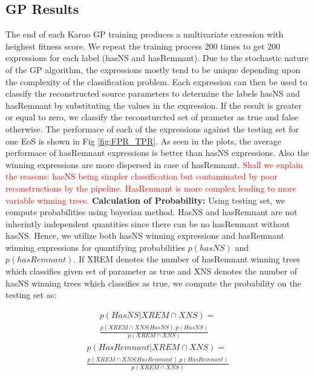 \subsection{GP Results}

The end of each Karoo GP training produces a multivariate exression with heighest fitness score. We repeat the training process 200 times to get 200 expressions for each label (hasNS and hasRemnant). Due to the stochastic nature of the GP algorithm, the expressions mostly tend to be unique depending upon the complexity of the classification problem. Each expression can then be used to classify the reconstructed source parameters to determine the labels hasNS and hasRemnant by substituting the values in the expression. If the result is greater or equal to zero, we classify the reconsturcted set of prameter as true and false otherwise. The performace of each of the expressions against the testing set for one EoS is shown in Fig \ref{fig:FPR_TPR}. As seen in the plots, the average performace of hasRemnant expressions is better than hasNS expressions. Also the winning expressions are more dispersed in case of hasRemnant.  \textcolor{red}{Shall we explain the reasons: hasNS being simpler classification but contaminated by poor reconstructions by the pipeline. HasRemnant is more complex leading to more variable winning trees.} 
\linebreak
\textbf{Calculation of Probability:} Using testing set, we compute probabilities using bayesian method. HasNS and hasRemnant are not inherintly independent quantities since there can be no hasRemnant without hasNS. Hence, we utilize both hasNS winning expressions and hasRemnant winning expressions for quantifying probabilities $p(hasNS)$ and $p(hasRemnant)$. If XREM denotes the number of hasRemnant winning trees which classifies given set of parameter as true and XNS denotes the number of hasNS winning trees which classifies as true, we compute the probability on the testing set as:    

\begin{equation} \label{eq:1}
\begin{split}
p(HasNS| XREM \cap XNS) =\\ 
\frac{p(XREM \cap XNS|HasNS).p(HasNS)}{p(XREM \cap XNS)}
\end{split}
\end{equation}
\begin{equation} \label{eq:2}
\begin{split}
p(HasRemnant| XREM \cap XNS) =\\ 
\frac{p(XREM \cap XNS|HasRemnant).p(HasRemnant)}{p(XREM \cap XNS)}
\end{split}
\end{equation}

